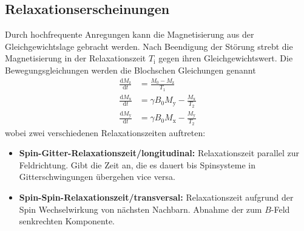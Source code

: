\subsection{Relaxationserscheinungen}%
\label{sub:relaxationserscheinungen}
Durch hochfrequente Anregungen kann die Magnetisierung aus der
Gleichgewichtslage gebracht werden.
Nach Beendigung der Störung strebt die Magnetisierung in der Relaxationszeit
$T_\text{i}$ gegen ihren Gleichgewichtswert. 
Die Bewegungsgleichungen werden die Blochschen Gleichungen genannt
\begin{align}
		\frac{\text{d} M_\text{z}}{\text{d} t} &= \frac{M_0 - M_\text{z}}{T_1} \\
		\frac{\text{d} M_\text{x}}{\text{d} t} &= \gamma B_0 M_\text{y} -
		\frac{M_\text{x}}{T_2} \\               
		\frac{\text{d} M_\text{y}}{\text{d} t} &= \gamma B_0 M_\text{x} - \frac{M_\text{y}}{T_2} 
\end{align}
wobei zwei verschiedenen Relaxationszeiten auftreten:
\begin{itemize}
		\item \textbf{Spin-Gitter-Relaxationszeit/longitudinal:}
				Relaxationszeit parallel zur Feldrichtung. Gibt die Zeit
				an, die es dauert bis Spinsysteme in Gitterschwingungen
				übergehen vice versa. 
		\item \textbf{Spin-Spin-Relaxationszeit/transversal:} Relaxationszeit
				aufgrund der Spin Wechselwirkung von nächsten Nachbarn. Abnahme
				der zum $B$-Feld senkrechten Komponente.
\end{itemize}


